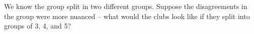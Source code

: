 We know the group split in two different groups.  Suppose the
disagreements in the group were more nuanced -- what would the clubs
look like if they split into groups of 3, 4, and 5?